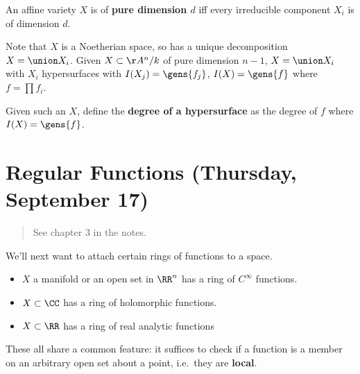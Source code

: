 \begin{definition}

An affine variety \(X\) is of \textbf{pure dimension \(d\)} iff every
irreducible component \(X_i\) is of dimension \(d\).

\end{definition}

\begin{remark}

Note that \(X\) is a Noetherian space, so has a unique decomposition
\(X = \union X_i\). Given \(X\subset \AA^n/k\) of pure dimension
\(n-1\), \(X = \union X_i\) with \(X_i\) hypersurfaces with
\(I(X_j) = \gens{f_j}\), \(I(X) = \gens{f}\) where \(f = \prod f_i\).

\end{remark}

\begin{definition}

Given such an \(X\), define the \textbf{degree of a hypersurface} as the
degree of \(f\) where \(I(X) = \gens{f}\).

\end{definition}

\hypertarget{regular-functions-thursday-september-17}{%
\section{Regular Functions (Thursday, September
17)}\label{regular-functions-thursday-september-17}}

\begin{quote}
See chapter 3 in the notes.
\end{quote}

We'll next want to attach certain rings of functions to a space.

\begin{example}

\envlist

\begin{itemize}
\tightlist
\item
  \(X\) a manifold or an open set in \(\RR^n\) has a ring of
  \(C^\infty\) functions.
\item
  \(X \subset \CC\) has a ring of holomorphic functions.
\item
  \(X\subset \RR\) has a ring of real analytic functions
\end{itemize}

These all share a common feature: it suffices to check if a function is
a member on an arbitrary open set about a point, i.e.~they are
\textbf{local}.

\end{example}

